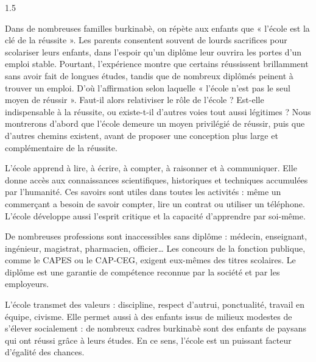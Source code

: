 \documentclass[12pt]{article}
\begin{document}
\begin{spacing}{1.5}


Dans de nombreuses familles burkinabè, on répète aux enfants que « l'école est la clé de la réussite ». Les parents consentent souvent de lourds sacrifices pour scolariser leurs enfants, dans l'espoir qu'un diplôme leur ouvrira les portes d'un emploi stable. Pourtant, l'expérience montre que certains réussissent brillamment sans avoir fait de longues études, tandis que de nombreux diplômés peinent à trouver un emploi. D'où l'affirmation selon laquelle « l'école n'est pas le seul moyen de réussir ». Faut-il alors relativiser le rôle de l'école ? Est-elle indispensable à la réussite, ou existe-t-il d'autres voies tout aussi légitimes ? Nous montrerons d'abord que l'école demeure un moyen privilégié de réussir, puis que d'autres chemins existent, avant de proposer une conception plus large et complémentaire de la réussite.


L'école apprend à lire, à écrire, à compter, à raisonner et à communiquer. Elle donne accès aux connaissances scientifiques, historiques et techniques accumulées par l'humanité. Ces savoirs sont utiles dans toutes les activités : même un commerçant a besoin de savoir compter, lire un contrat ou utiliser un téléphone. L'école développe aussi l'esprit critique et la capacité d'apprendre par soi-même.

De nombreuses professions sont inaccessibles sans diplôme : médecin, enseignant, ingénieur, magistrat, pharmacien, officier\dots{} Les concours de la fonction publique, comme le CAPES ou le CAP-CEG, exigent eux-mêmes des titres scolaires. Le diplôme est une garantie de compétence reconnue par la société et par les employeurs.

L'école transmet des valeurs : discipline, respect d'autrui, ponctualité, travail en équipe, civisme. Elle permet aussi à des enfants issus de milieux modestes de s'élever socialement : de nombreux cadres burkinabè sont des enfants de paysans qui ont réussi grâce à leurs études. En ce sens, l'école est un puissant facteur d'égalité des chances.



\end{spacing}
\end{document}
